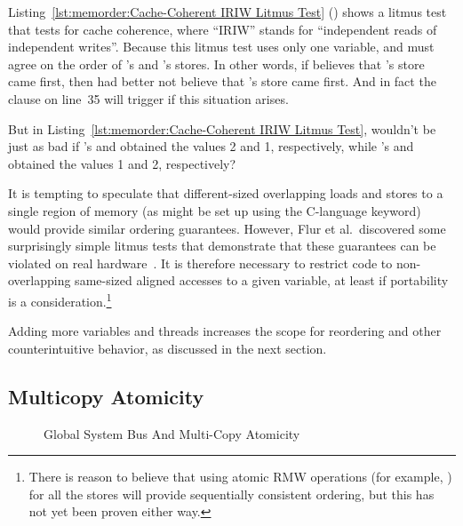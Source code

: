 Listing~\ref{lst:memorder:Cache-Coherent IRIW Litmus Test}
()
shows a litmus test that tests for cache coherence,
where ``IRIW'' stands
for ``independent reads of independent writes''.
Because this litmus test uses only one variable,
 and  must agree
on the order of 's and 's stores.
In other words, if  believes that 's store
came first, then  had better not believe that
's store came first.
And in fact the  clause on line~35 will trigger if this
situation arises.

\QuickQuiz{}
	But in
	Listing~\ref{lst:memorder:Cache-Coherent IRIW Litmus Test},
	wouldn't be just as bad if 's  and 
	obtained the values 2 and 1, respectively, while 's
	 and  obtained the values 1 and 2, respectively?
 \QuickQuizEnd

It is tempting to speculate that different-sized overlapping loads
and stores to a single region of memory (as might be set up using
the C-language  keyword) would provide similar ordering
guarantees.
However, Flur et al.~discovered some surprisingly simple
litmus tests that demonstrate that these guarantees can be violated on
real hardware~\cite{Flur:2017:MCA:3093333.3009839}.
It is therefore necessary to restrict code to non-overlapping
same-sized aligned accesses to a given variable, at least if portability
is a consideration.\footnote{
	There is reason to believe that using atomic RMW operations
	(for example, ) for all the stores will
	provide sequentially consistent ordering, but this has not
	yet been proven either way.}

Adding more variables and threads increases the scope for reordering
and other counterintuitive behavior, as discussed in the next section.

\subsection{Multicopy Atomicity}
\label{sec:memorder:Multicopy Atomicity}

\begin{figure}[tb]
\centering
{}
\caption{Global System Bus And Multi-Copy Atomicity}
\label{fig:memorder:Global System Bus And Multi-Copy Atomicity}
\end{figure}

